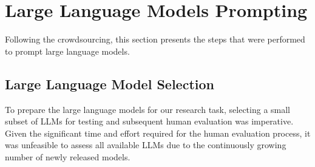 \section{Large Language Models Prompting}
Following the crowdsourcing, this section presents the steps that were performed to prompt large language models.
\subsection{Large Language Model Selection}
To prepare the large language models for our research task, selecting a small subset of LLMs for testing and subsequent human evaluation was imperative. Given the significant time and effort required for the human evaluation process, it was unfeasible to assess all available LLMs due to the continuously growing number of newly released models.

